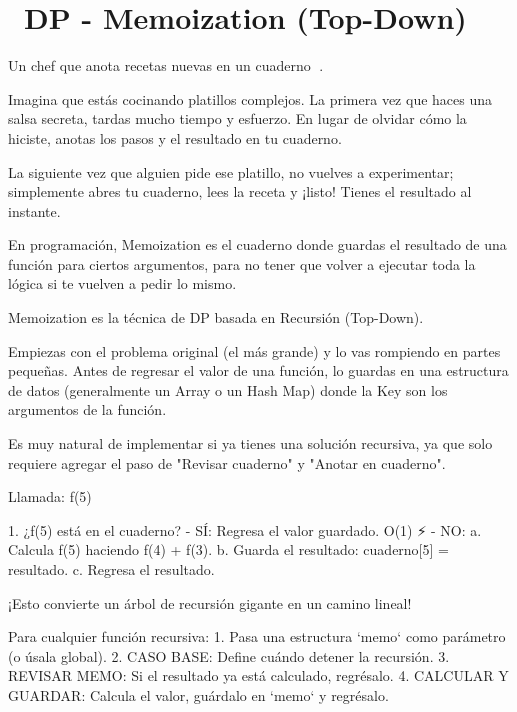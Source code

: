 ﻿\chapter[\emj{💭}~DP - Memoization (Top-Down)]{~DP - Memoization (Top-Down)}

\begin{dsaquees}
Un chef que anota recetas nuevas en un cuaderno 📖. 

Imagina que estás cocinando platillos complejos. La primera vez que
haces una salsa secreta, tardas mucho tiempo y esfuerzo. En lugar de
olvidar cómo la hiciste, anotas los pasos y el resultado en tu 
cuaderno.

La siguiente vez que alguien pide ese platillo, no vuelves a 
experimentar; simplemente abres tu cuaderno, lees la receta y 
¡listo! Tienes el resultado al instante. 

En programación, Memoization es el cuaderno donde guardas el resultado
de una función para ciertos argumentos, para no tener que volver a 
ejecutar toda la lógica si te vuelven a pedir lo mismo.
\end{dsaquees}
\begin{dsaotraforma}
Memoization es la técnica de DP basada en Recursión (Top-Down). 

Empiezas con el problema original (el más grande) y lo vas rompiendo 
en partes pequeñas. Antes de regresar el valor de una función, lo
guardas en una estructura de datos (generalmente un Array o un Hash Map)
donde la Key son los argumentos de la función.

Es muy natural de implementar si ya tienes una solución recursiva,
ya que solo requiere agregar el paso de "Revisar cuaderno" y 
"Anotar en cuaderno".
\end{dsaotraforma}
\begin{dsadiagrama}
Llamada: f(5)

1. ¿f(5) está en el cuaderno?
   - SÍ: Regresa el valor guardado. O(1) ⚡
   - NO:
     a. Calcula f(5) haciendo f(4) + f(3).
     b. Guarda el resultado: cuaderno[5] = resultado.
     c. Regresa el resultado.

¡Esto convierte un árbol de recursión gigante en un camino lineal!
\end{dsadiagrama}
\begin{dsacomofunciona}
Para cualquier función recursiva:
1. Pasa una estructura `memo` como parámetro (o úsala global).
2. CASO BASE: Define cuándo detener la recursión.
3. REVISAR MEMO: Si el resultado ya está calculado, regrésalo.
4. CALCULAR Y GUARDAR: Calcula el valor, guárdalo en `memo` y regrésalo.
\end{dsacomofunciona}
